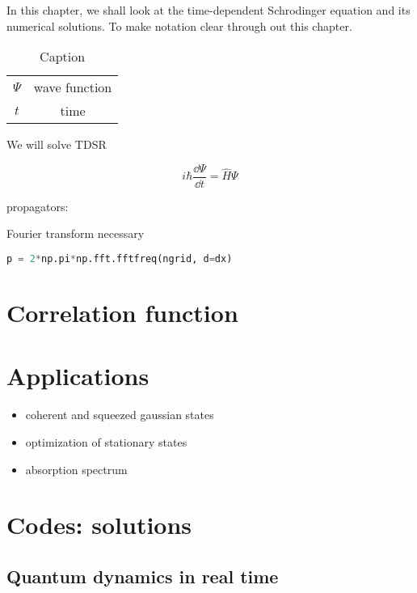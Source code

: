 In this chapter, we shall look at the time-dependent Schrodinger equation and its numerical solutions. To make notation clear through out this chapter.

\begin{table}[ht]
    \centering
    \begin{tabular}{c|c}
         $\Psi$ & wave function \\
         $t$ & time
    \end{tabular}
    \caption{Caption}
    \label{tab:my_label}
\end{table}

We will solve TDSR

\begin{equation}
    i\hbar\frac{\dd\Psi}{\dd t} = \hat{H}\Psi
\end{equation}

propagators:

Fourier transform necessary
\begin{lstlisting}[language=Python, style=mystyle2]
p = 2*np.pi*np.fft.fftfreq(ngrid, d=dx)
\end{lstlisting}

\section{Correlation function}



\section{Applications}

\begin{itemize}
    \item coherent and squeezed gaussian states
    \item optimization of stationary states
    \item absorption spectrum
\end{itemize}

\section{Codes: solutions}
\subsection{Quantum dynamics in real time}
\lstset{style=mystyle}


